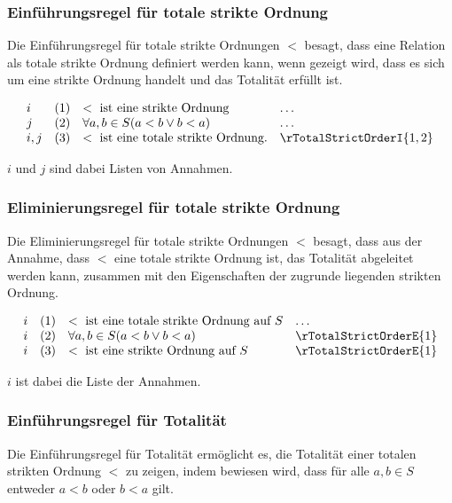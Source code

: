 \documentclass[main.tex]{subfiles}
\begin{document}
\subsubsection*{Einführungsregel für totale strikte Ordnung}
\label{rule:rTotalStrictOrderI}
Die Einführungsregel für totale strikte Ordnungen \(<\) besagt, dass eine Relation als totale strikte Ordnung definiert werden kann, wenn gezeigt wird, dass es sich um eine strikte Ordnung handelt und das Totalität erfüllt ist.

\[
\begin{array}{llll}
    i       & (1) & < \text{ ist eine strikte Ordnung} & \dots \\
    j       & (2) & \forall a, b \in S (a < b \lor b < a) & \dots \\
    i,j     & (3) & < \text{ ist eine totale strikte Ordnung.} & \rTotalStrictOrderI{1,2}
\end{array}
\]

\(i\) und \(j\) sind dabei Listen von Annahmen.

\subsubsection*{Eliminierungsregel für totale strikte Ordnung}
\label{rule:rTotalStrictOrderE}
Die Eliminierungsregel für totale strikte Ordnungen \(<\) besagt, dass aus der Annahme, dass \(<\) eine totale strikte Ordnung ist, das Totalität abgeleitet werden kann, zusammen mit den Eigenschaften der zugrunde liegenden strikten Ordnung.

\[
\begin{array}{llll}
    i       & (1) & < \text{ ist eine totale strikte Ordnung auf } S & \dots \\
    i       & (2) & \forall a, b \in S (a < b \lor b < a) & \rTotalStrictOrderE{1} \\
    i       & (3) & < \text{ ist eine strikte Ordnung auf }S & \rTotalStrictOrderE{1}
\end{array}
\]

\(i\) ist dabei die Liste der Annahmen.

\subsubsection*{Einführungsregel für Totalität}
\label{rule:rTotalityStrictRI}
Die Einführungsregel für Totalität ermöglicht es, die Totalität einer totalen strikten Ordnung \(<\) zu zeigen, indem bewiesen wird, dass für alle \(a, b \in S\) entweder \(a < b\) oder \(b < a\) gilt.
\end{document}
